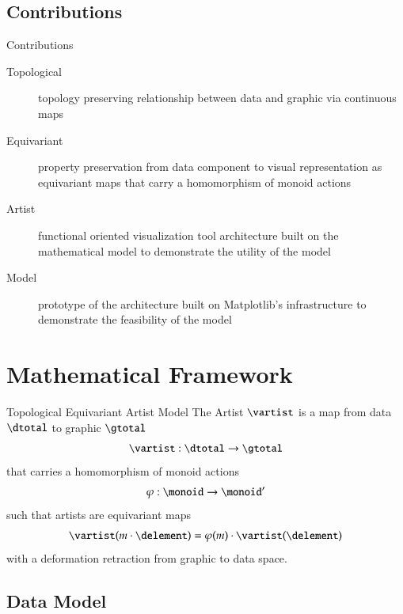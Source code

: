\documentclass[xcolor={dvipsnames}, handout]{beamer}
\begin{document}
\subsection{Contributions}
\begin{frame}{Contributions}
    \begin{description}
        \item[Topological] topology preserving relationship between data and graphic via continuous maps
        \item[Equivariant] property preservation from data component to visual representation as equivariant maps that carry a homomorphism of monoid actions
        \item[Artist] functional oriented visualization tool architecture built on the mathematical model to demonstrate the utility of the model
        \item [Model] prototype of the architecture built on Matplotlib's infrastructure to demonstrate the feasibility of the model
    \end{description}
\end{frame}

\section{Mathematical Framework}

\begin{frame}{Topological Equivariant Artist Model}
    The Artist $\mathscr{\vartist}$ is a map from data $\mathscr{\dtotal}$ to graphic $\mathscr{\gtotal}$
    \begin{equation}
        \mathscr{\vartist}: \mathscr{\dtotal} \rightarrow \mathscr{\gtotal}
    \end{equation}
    \pause
     that carries a homomorphism of monoid actions 
    \begin{equation}
    \varphi: \monoid \rightarrow \monoid^{\prime}
    \end{equation}
    \pause
    such that artists are equivariant maps 
    \begin{equation}
    \mathscr{\vartist}(m\cdot \delement) = \varphi(m)\cdot\mathscr{\vartist}(\delement) 
    \end{equation}
    \pause 
    with a deformation retraction from graphic to data space. 
\end{frame}

\subsection{Data Model}
\end{document}
